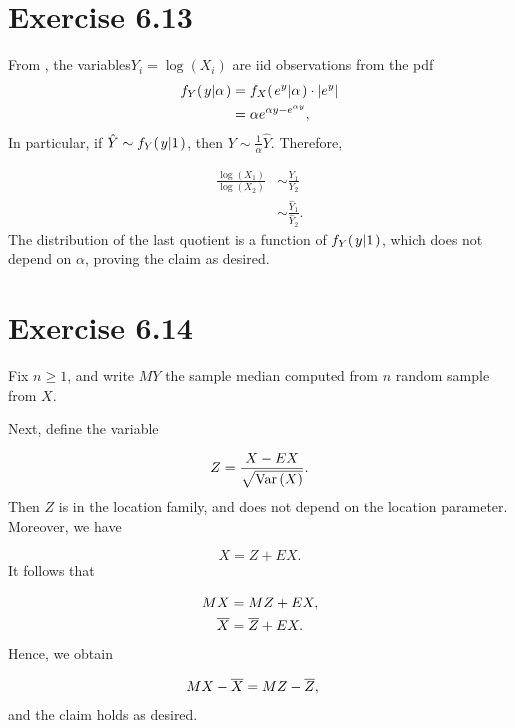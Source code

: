 \documentclass[12pt,letterpaper,reqno]{amsart}
\numberwithin{equation}{subsection}
\begin{document}
\newpage
\section{Exercise 6.13}

From \cite[Theorem 4.3.5 on page 161]{Berger-Casella}, the variables$Y_i = \log(X_i)$ are iid observations from the pdf
\begin{align*}
    {f_Y}\! \left( {\left. {y} \middle| {\alpha} \right.} \right) &= {f_{X}}\! \left( {\left. {e^y} \middle| {\alpha} \right.} \right) \cdot \left\lvert{e^y}\right\rvert \\
    &= \alpha e^{\alpha y - e^{\alpha y}},
\end{align*}
In particular, if $\hat{Y} \sim {f_Y}\! \left( {\left. {y} \middle| {1} \right.} \right)$, then $Y \sim \frac{1}{\alpha} \hat{Y}$. Therefore,

\begin{align*}
    \frac{\log(X_1)}{\log(X_2)} &\sim \frac{Y_1}{Y_2} \\
    &\sim \frac{\hat{Y}_1}{\hat{Y}_2}.
\end{align*}
The distribution of the last quotient is a function of ${f_Y}\! \left( {\left. {y} \middle| {1} \right.} \right)$, which does not depend on $\alpha$, proving the claim as desired.

\newpage
\section{Exercise 6.14}

Fix $n \geq 1$, and write $MY$ the sample median computed from $n$ random sample from $X$.

Next, define the variable

\[ Z = \frac{X- EX}{\sqrt{\operatorname{Var}\left( {X} \right)}}. \]
Then $Z$ is in the location family, and does not depend on the location parameter. Moreover, we have

\[ X = Z + EX. \]
It follows that

\begin{align*}
    MX &= MZ + EX, \\
    \overline{{X}} &= \overline{{Z}} + EX.
\end{align*}
Hence, we obtain

\begin{align*}
    MX - \overline{{X}} &= MZ - \overline{{Z}},
\end{align*}
and the claim holds as desired.

\newpage
\nocite{*}
\printbibliography
\end{document}
